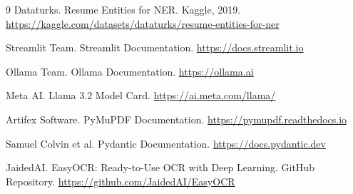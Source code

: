 \documentclass[11pt,a4paper]{article}
\begin{document}
\begin{thebibliography}{9}
Dataturks. Resume Entities for NER. Kaggle, 2019.\newline
\href{https://kaggle.com/datasets/dataturks/resume-entities-for-ner}{https://kaggle.com/datasets/dataturks/resume-entities-for-ner}

Streamlit Team. Streamlit Documentation.\newline
\href{https://docs.streamlit.io}{https://docs.streamlit.io}

Ollama Team. Ollama Documentation.\newline
\href{https://ollama.ai}{https://ollama.ai}

Meta AI. Llama 3.2 Model Card.\newline
\href{https://ai.meta.com/llama/}{https://ai.meta.com/llama/}

Artifex Software. PyMuPDF Documentation.\newline
\href{https://pymupdf.readthedocs.io}{https://pymupdf.readthedocs.io}

Samuel Colvin et al. Pydantic Documentation.\newline
\href{https://docs.pydantic.dev}{https://docs.pydantic.dev}

JaidedAI. EasyOCR: Ready-to-Use OCR with Deep Learning. GitHub Repository.\newline
\href{https://github.com/JaidedAI/EasyOCR}{https://github.com/JaidedAI/EasyOCR}
\end{thebibliography}
\end{document}
